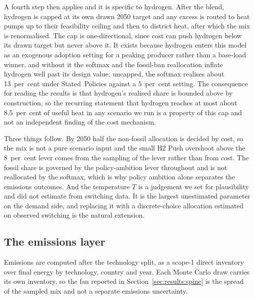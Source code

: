 A fourth step then applies and it is specific to hydrogen. After the blend, hydrogen is
capped at its own drawn 2050 target and any excess is routed to heat pumps up to their
feasibility ceiling and then to district heat, after which the mix is renormalised. The
cap is one-directional, since cost can push hydrogen below its drawn target but never
above it.
It exists because hydrogen enters this model as an exogenous adoption setting for a peaking
producer rather
than a base-load winner, and without it the softmax and the fossil-ban reallocation inflate
hydrogen well past its design value; uncapped, the softmax realises about
13~per~cent under Stated~Policies against a 5~per~cent setting. The consequence for reading
the results is that hydrogen's realised share is bounded above by construction, so the
recurring statement that hydrogen reaches at most about 8.5~per~cent of useful heat in any
scenario we run is a property of this cap and not an independent finding of the cost
mechanism.

Three things follow. By 2050 half the non-fossil allocation is decided by cost, so the mix
is not a pure scenario input and the small H2 Push overshoot above the 8~per~cent lever
comes from the sampling of the lever rather than from cost. The fossil share is governed
by the policy-ambition lever throughout and is not reallocated by the softmax, which is
why policy ambition alone separates the emissions outcomes. And the temperature $T$ is a
judgement we set for plausibility and did not estimate from switching data. It is the
largest unestimated parameter on the demand side, and replacing it with a discrete-choice
allocation estimated on observed switching is the natural extension.

\subsection{The emissions layer}
\label{sec:method:emissions}

Emissions are computed after the technology split, as a scope-1 direct inventory over
final energy by technology, country and year. Each Monte Carlo draw carries its own
inventory, so the fan reported in Section~\ref{sec:results:spine} is the spread of the
sampled mix and not a separate emissions uncertainty.


